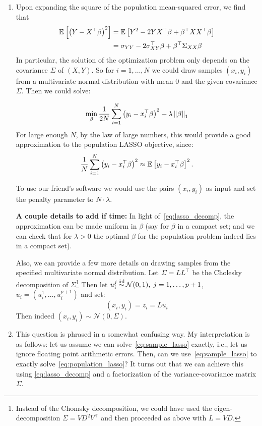  \begin{enumerate}[label=(\alph*)]
 
 \item  Upon expanding the square of the population mean-squared error, we find that
 \begin{align}
 \label{eq:lasso_decomp}
 \mathbb{E}_{}\left[\left(Y - X^\top \beta\right)^2\right] &= \mathbb{E}_{}\left[Y^2 -2 Y X^\top \beta+ \beta^\top  X X^\top  \beta \right]\nonumber \\
 & = \sigma_{YY}-2 \sigma_{XY}^\top \beta
  + \beta^\top \Sigma_{XX} \beta \end{align}
 In particular, the solution of the optimization problem only depends on the covariance $\Sigma$ of $(X,Y)$. So for $i=1,\dotsc,N$ we could draw samples $(x_i, y_i)$ from a multivariate normal distribution with mean $0$ and the given covariance $\Sigma$. Then we could solve:
 
 \begin{equation}
 \label{eq:sample_lasso}
 \min_{\beta} \frac{1}{2 N} \sum_{i=1}^N \left(y_i - x_i^\top \beta\right)^2 + \lambda  \left\lVert\beta\right\rVert_1
 \end{equation}
 For large enough $N$, by the law of large numbers, this would provide a good approximation to the population LASSO objective, since:
 $$  \frac{1}{N} \sum_{i=1}^N \left(y_i - x_i^\top \beta\right)^2 \approx  \mathbb{E}_{}\left[y_i - x_i^\top \beta\right]^2.$$
 
 
 To use our friend's software we would use the pairs $(x_i, y_i)$ as input and set the penalty parameter to $N \cdot \lambda$. 
 
 
 \textbf{A couple details to add if time:}  In light of~\eqref{eq:lasso_decomp}, the approximation can be made uniform in $\beta$ (say for $\beta$ in a compact set; and we can check that for $\lambda > 0$ the optimal $\beta$ for the population problem indeed lies in a compact set). 
 
 Also, we can provide a few more details on drawing samples from the specified multivariate normal distribution. Let $\Sigma = LL^\top$ be the Cholesky decomposition of $\Sigma$\footnote{Instead of the Chomsky decomposition, we could have used the eigen-decomposition $\Sigma = VD^2V^\top$ and then proceeded as above with $L=VD$.} Then let $u_i^j \simiid \mathcal{N}(0, 1),\; j=1,\dotsc,p+1$, $u_i = (u_i^1, \dotsc, u_i^{p+1})$ and set:
 $$ (x_i, y_i) = z_i = Lu_i$$
 Then indeed $(x_i, y_i) \sim \mathcal{N}(0, \Sigma)$.
 
 
 \item This question is phrased in a somewhat confusing way. My interpretation is as follows: let us assume we can solve~\eqref{eq:sample_lasso} exactly, i.e., let us ignore floating point arithmetic errors. Then, can we use~\eqref{eq:sample_lasso} to exactly solve~\eqref{eq:population_lasso}? It turns out that we can achieve this using \eqref{eq:lasso_decomp} and a factorization of the variance-covariance matrix $\Sigma$.
 

\end{enumerate}

